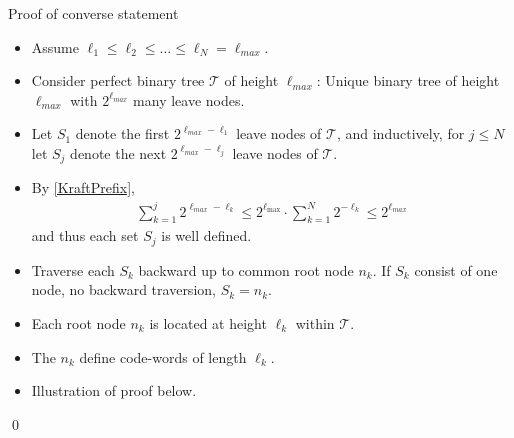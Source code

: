 

\begin{frame}{Proof of converse statement}
\begin{itemize}
\item Assume $\ell_1\leq \ell_2\leq \dots\leq \ell_N=\ell_{max}$. 
\item Consider perfect binary tree $\mathcal{T}$ of height $\ell_{max}$: Unique binary tree of height $\ell_{max}$ with $2^{\ell_{max}}$ many leave nodes. 
\item Let $S_1$ denote the first $2^{\ell_{max}-\ell_1}$ leave nodes of $\mathcal{T}$, and inductively, for $j\leq N$ let $S_{j}$ denote the next $2^{\ell_{max}-\ell_j}$ leave nodes of $\mathcal{T}$.
\item By \eqref{KraftPrefix}, 
\begin{align*}
\sum_{k=1}^j2^{\ell_{max}-\ell_k}\leq 2^{\ell_{\max}}\cdot \sum_{k=1}^{N}2^{-\ell_k}\leq 2^{\ell_{max}}
\end{align*}
and thus each set $S_j$ is well defined.
\item Traverse each $S_k$ backward up to common root node $n_k$. If $S_k$ consist of one node, no backward traversion, $S_k=n_k$. 
\item Each root node $n_k$ is located at height $\ell_k$ within $\mathcal{T}$.
\item [\iarrow] The $n_k$ define code-words of length $\ell_k$.  
\item  Illustration of proof below.  

\end{itemize}
\qed
\end{frame}


